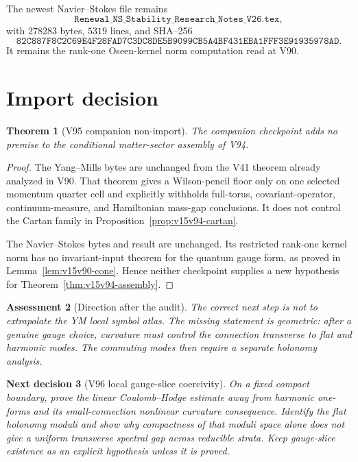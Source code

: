 \documentclass[11pt]{article}
\newtheorem{theorem}{Theorem}[section]
\newtheorem{decision}[theorem]{Next decision}
\newtheorem{assessment}[theorem]{Assessment}
\theoremstyle{remark}
\begin{document}
The newest Navier--Stokes file remains
\[
 \texttt{Renewal\_NS\_Stability\_Research\_Notes\_V26.tex},       \tag{95.3}
\]
with \(278283\) bytes, \(5319\) lines, and SHA--256
\[
 \texttt{82C887F8C2C69E4F28FAD7C3DC8DE5B9099CB5A4BF431EBA1FFF3E91935978AD}.
                                                               \tag{95.4}
\]
It remains the rank-one Oseen-kernel norm computation read at V90.

\section{Import decision}

\begin{theorem}[V95 companion non-import]
\label{thm:v15v95-nonimport}
The companion checkpoint adds no premise to the conditional
matter-sector assembly of V94.
\end{theorem}

\begin{proof}
The Yang--Mills bytes are unchanged from the V41 theorem already
analyzed in V90.  That theorem gives a Wilson-pencil floor only on
one selected momentum quarter cell and explicitly withholds
full-torus, covariant-operator, continuum-measure, and Hamiltonian
mass-gap conclusions.  It does not control the Cartan family in
Proposition~\ref{prop:v15v94-cartan}.

The Navier--Stokes bytes and result are unchanged.  Its restricted
rank-one kernel norm has no invariant-input theorem for the quantum
gauge form, as proved in Lemma~\ref{lem:v15v90-cone}.  Hence neither
checkpoint supplies a new hypothesis for
Theorem~\ref{thm:v15v94-assembly}.
\end{proof}

\begin{assessment}[Direction after the audit]
\label{ass:v15v95-direction}
The correct next step is not to extrapolate the YM local symbol
atlas.  The missing statement is geometric: after a genuine gauge
choice, curvature must control the connection transverse to flat
and harmonic modes.  The commuting modes then require a separate
holonomy analysis.
\end{assessment}

\begin{decision}[V96 local gauge-slice coercivity]
\label{dec:v15v95-next}
On a fixed compact boundary, prove the linear Coulomb--Hodge
estimate away from harmonic one-forms and its small-connection
nonlinear curvature consequence.  Identify the flat holonomy
moduli and show why compactness of that moduli space alone does not
give a uniform transverse spectral gap across reducible strata.
Keep gauge-slice existence as an explicit hypothesis unless it is
proved.
\end{decision}
\end{document}
